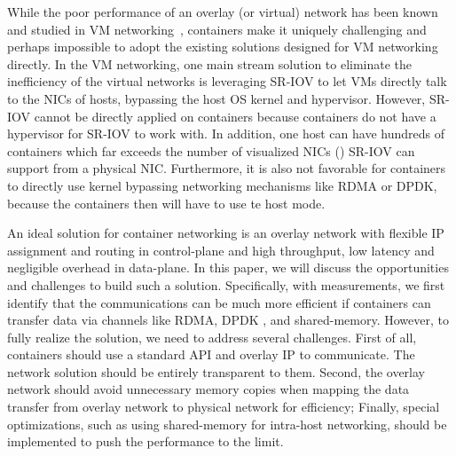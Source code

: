 While the poor performance of an overlay (or virtual) network has been 
known and studied in VM networking~\cite{?}, containers make it uniquely challenging and perhaps impossible to adopt the existing solutions designed
for VM networking directly.
In the VM networking, one main stream solution to eliminate the inefficiency of the virtual networks is leveraging SR-IOV to let VMs directly talk to the NICs of hosts, bypassing the host OS kernel and hypervisor. 
However, SR-IOV cannot be directly applied on containers because containers 
do not have a hypervisor for SR-IOV to work with. In addition, one host can have
hundreds of containers which far exceeds the number of visualized NICs () SR-IOV can support from a physical NIC. Furthermore, it is also not
favorable for containers to directly use kernel bypassing networking mechanisms like RDMA or DPDK, because the containers then will have to use te host mode.
 

An ideal solution for container networking is an overlay network with flexible
IP assignment and routing in control-plane and high 
throughput, low latency and negligible overhead in data-plane. In this paper, we 
will discuss the opportunities and challenges to build such a solution. 
Specifically, with measurements, we first identify that the communications 
can be much more efficient if containers can transfer data via channels like
RDMA, DPDK , and shared-memory. However, to fully
realize the solution, we need to address several challenges. First of all, 
containers should use a standard API and overlay IP to communicate. The network
solution should be entirely transparent to them. Second, the overlay network
should avoid unnecessary memory copies when mapping the data transfer from
overlay network to physical network for efficiency; Finally, special optimizations, such as using shared-memory for intra-host networking, should be
implemented to push the performance to the limit.  
